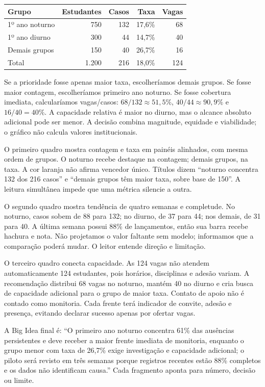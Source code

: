 \begin{center}
\begin{tabular}{lrrrr}
\toprule
Grupo & Estudantes & Casos & Taxa & Vagas \\
\midrule
1º ano noturno & 750 & 132 & 17,6\% & 68 \\
1º ano diurno & 300 & 44 & 14,7\% & 40 \\
Demais grupos & 150 & 40 & 26,7\% & 16 \\
\midrule
Total & 1.200 & 216 & 18,0\% & 124 \\
\bottomrule
\end{tabular}
\end{center}

Se a prioridade fosse apenas maior taxa, escolheríamos demais grupos. Se fosse maior contagem, escolheríamos primeiro ano noturno. Se fosse cobertura imediata, calcularíamos vagas/casos: $68/132\approx51{,}5\%$, $40/44\approx90{,}9\%$ e $16/40=40\%$. A capacidade relativa é maior no diurno, mas o alcance absoluto adicional pode ser menor. A decisão combina magnitude, equidade e viabilidade; o gráfico não calcula valores institucionais.

O primeiro quadro mostra contagem e taxa em painéis alinhados, com mesma ordem de grupos. O noturno recebe destaque na contagem; demais grupos, na taxa. A cor laranja não afirma vencedor único. Títulos dizem ``noturno concentra 132 dos 216 casos'' e ``demais grupos têm maior taxa, sobre base de 150''. A leitura simultânea impede que uma métrica silencie a outra.

O segundo quadro mostra tendência de quatro semanas e completude. No noturno, casos sobem de 88 para 132; no diurno, de 37 para 44; nos demais, de 31 para 40. A última semana possui 88\% de lançamentos, então sua barra recebe hachura e nota. Não projetamos o valor faltante sem modelo; informamos que a comparação poderá mudar. O leitor entende direção e limitação.

O terceiro quadro conecta capacidade. As 124 vagas não atendem automaticamente 124 estudantes, pois horários, disciplinas e adesão variam. A recomendação distribui 68 vagas no noturno, mantém 40 no diurno e cria busca de capacidade adicional para o grupo de maior taxa. Contato de apoio não é contado como monitoria. Cada frente terá indicador de convite, adesão e presença, evitando declarar sucesso apenas por ofertar vagas.

A Big Idea final é: ``O primeiro ano noturno concentra 61\% das ausências persistentes e deve receber a maior frente imediata de monitoria, enquanto o grupo menor com taxa de 26,7\% exige investigação e capacidade adicional; o piloto será revisto em três semanas porque registros recentes estão 88\% completos e os dados não identificam causa.'' Cada fragmento aponta para número, decisão ou limite.

